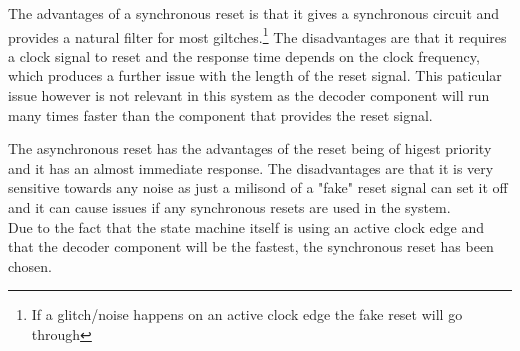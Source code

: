 \documentclass[../../../main]{subfiles}
\begin{document}
The advantages of a synchronous reset is that it gives a synchronous circuit and provides a natural filter for most giltches.\footnote{If a glitch/noise happens on an active clock edge the fake reset will go through}
The disadvantages are that it requires a clock signal to reset and the response time depends on the clock frequency, which produces a further issue with the length of the reset signal.
This paticular issue however is not relevant in this system as the decoder component will run many times faster than the component that provides the reset signal.

The asynchronous reset has the advantages of the reset being of higest priority and it has an almost immediate response.
The disadvantages are that it is very sensitive towards any noise as just a milisond of a "fake" reset signal can set it off and it can cause issues if any synchronous resets are used in the system. \\

Due to the fact that the state machine itself is using an active clock edge and that the decoder component will be the fastest, the synchronous reset has been chosen.
\end{document}

